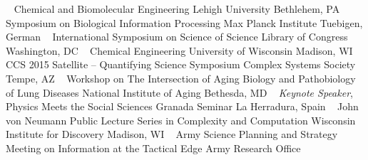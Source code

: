 ~
\Gap
{}
Chemical and Biomolecular Engineering
\newline
    Lehigh University
    \newline
Bethlehem, PA
\newline
~
\Gap
{}
Symposium on Biological Information Processing
\newline
    Max Planck Institute
    \newline
Tuebigen, German
\newline
~
\Gap
{}
International Symposium on Science of Science
\newline
    Library of Congress
    \newline
Washington, DC
\newline
~
\Gap
{}
Chemical Engineering
\newline
    University of Wisconsin
    \newline
Madison, WI
\newline
~
\Gap
{}
CCS 2015 Satellite -- Quantifying Science Symposium
\newline
    Complex Systems Society
    \newline
Tempe, AZ
\newline
~
\Gap
{}
Workshop on The Intersection of Aging Biology and Pathobiology of Lung Diseases
\newline
    National Institute of Aging
    \newline
Bethesda, MD
\newline
~
\Gap
{}
\textit{Keynote Speaker}, Physics Meets the Social Sciences
\newline
    Granada Seminar
    \newline
La Herradura, Spain
\newline
~
\Gap
{}
John von Neumann Public Lecture Series in Complexity and Computation
\newline
    Wisconsin Institute for Discovery
    \newline
Madison, WI
\newline
~
\Gap
{}
Army Science Planning and Strategy Meeting on Information at the Tactical Edge
\newline
    Army Research Office
    \newline
